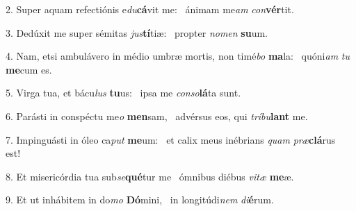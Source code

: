 2. Super aquam refectiónis e\textit{du}\textbf{cá}vit me: \ast\  ánimam me\textit{am} \textit{con}\textbf{vér}tit.\

3. Dedúxit me super sémitas \textit{jus}\textbf{tí}tiæ: \ast\  propter \textit{no}\textit{men} \textbf{su}um.\

4. Nam, etsi ambulávero in médio umbræ mortis, non timé\textit{bo} \textbf{ma}la: \ast\  quóni\textit{am} \textit{tu} \textbf{me}cum es.\

5. Virga tua, et bácu\textit{lus} \textbf{tu}us: \ast\  ipsa me \textit{con}\textit{so}\textbf{lá}ta sunt.\

6. Parásti in conspéctu me\textit{o} \textbf{men}sam, \ast\  advérsus eos, qui \textit{trí}\textit{bu}\textbf{lant} me.\

7. Impinguásti in óleo ca\textit{put} \textbf{me}um: \ast\  et calix meus inébrians \textit{quam} \textit{præ}\textbf{clá}rus est!\

8. Et misericórdia tua sub\textit{se}\textbf{qué}tur me \ast\  ómnibus diébus \textit{vi}\textit{tæ} \textbf{me}æ.\

9. Et ut inhábitem in do\textit{mo} \textbf{Dó}mini, \ast\  in longitúdi\textit{nem} \textit{di}\textbf{é}rum.\

